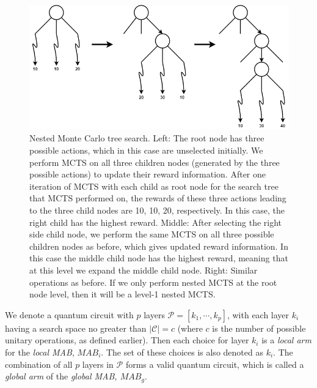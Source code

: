 \documentclass[a4paper,onecolumn,11pt]{quantumarticle}
\begin{document}
\begin{figure}[H]
  \centering
  \includegraphics[width=0.8\linewidth]{Figures/nmcs.png}
  \caption{Nested Monte Carlo tree search. Left: The root node has three possible actions, which in this case are unselected initially. We perform MCTS on all three children nodes (generated by the three possible actions) to update their reward information. After one iteration of MCTS with each child as root node for the search tree that MCTS performed on, the rewards of these three actions leading to the three child nodes are 10, 10, 20, respectively. In this case, the right child has the highest reward. Middle: After selecting the right side child node, we perform the same MCTS on all three possible children nodes as before, which gives updated reward information. In this case the middle child node has the highest reward, meaning that at this level we expand the middle child node. Right: Similar operations as before. If we only perform nested MCTS at the root node level, then it will be a level-1 nested MCTS.}
  \label{fig:nestedmcts}
\end{figure}



We denote a quantum circuit with $p$ layers $\mathcal{P} = [k_1,\cdots, k_p]$, with each layer $k_i$ having a search space no greater than $\vert \mathcal{C} \vert = c$ (where $c$ is the number of possible unitary operations, as defined earlier). Then each choice for layer $k_i$ is a \textit{local arm} for the \textit{local MAB}, $MAB_i$. The set of these choices is also denoted as $k_i$. The combination of all $p$ layers in $\mathcal{P}$ forms a valid quantum circuit, which is called a \textit{global arm} of the \textit{global MAB, $MAB_g$}. 
\end{document}
